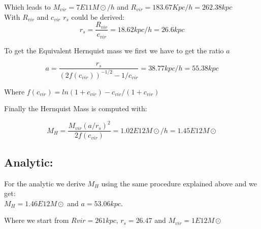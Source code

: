 Which leads to $M_{vir} =  7E11 M\odot / h $ and $R_{vir} = 183.67 Kpc / h  = 262.38 kpc$ \\
 
With $R_{vir}$ and $c_{vir}$ $r_s$  could be derived: \\

\begin{equation}
r_s = \dfrac{R_{vir}} {c_{vir}} = 18.62 kpc/ h = 26.6 kpc
\end{equation} 

To get the Equivalent Hernquist mass we first we have to get the ratio $a$

\begin{equation}
a = \dfrac{r_s}{(2 f(c_{vir}))^{-1/2} - 1/c_{vir}} = 38.77 kpc/ h  = 55.38 kpc
\end{equation}

Where $f(c_{vir}) = ln(1 + c_{vir}) - c_{vir}/(1+c_{vir})$

Finally the Hernquist Mass is computed with:

\begin{equation}
M_H = \dfrac{M_{vir} (a/r_s)^2}{2f(c_{vir})} = 1.02E12 M\odot / h = 1.45E12 M\odot
\end{equation}

\subsection{Analytic:}

For the analytic we derive $M_H$ using the same procedure explained above and we get: \\

$M_H = 1.46E12 M\odot$ and  $a = 53.06 kpc$. 

Where we start from $Rvir = 261 kpc$, $r_s = 26.47$ and $M_{vir} = 1E12 M\odot$

